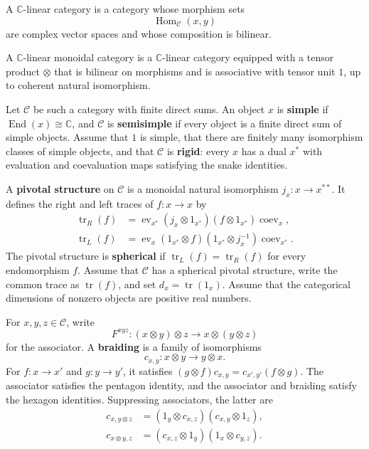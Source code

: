 \documentclass{article}
\newcommand{\trace}{\operatorname{tr}}
\newcommand{\ev}{\operatorname{ev}}
\newcommand{\coev}{\operatorname{coev}}
\newcommand{\End}{\operatorname{End}}
\begin{document}
A $\mathbb C$-linear category is a category whose morphism sets
\[
\operatorname{Hom}_{\mathcal C}(x,y)
\]
are complex vector spaces and whose composition is bilinear.

A $\mathbb C$-linear monoidal category is a $\mathbb C$-linear category equipped with a tensor product $\otimes$ that is bilinear on morphisms and is associative with tensor unit $1$, up to coherent natural isomorphism.

Let $\mathcal C$ be such a category with finite direct sums. An object $x$ is \textbf{simple} if $\End(x)\cong\mathbb C$, and $\mathcal C$ is \textbf{semisimple} if every object is a finite direct sum of simple objects. Assume that $1$ is simple, that there are finitely many isomorphism classes of simple objects, and that $\mathcal C$ is \textbf{rigid}: every $x$ has a dual $x^*$ with evaluation and coevaluation maps satisfying the snake identities.

A \textbf{pivotal structure} on $\mathcal C$ is a monoidal natural
isomorphism $j_x:x\to x^{**}$. It defines the right and left traces of
$f:x\to x$ by
\[
\begin{aligned}
\trace_R(f)
&=\ev_{x^*}(j_x\otimes1_{x^*})(f\otimes1_{x^*})\coev_x,\\
\trace_L(f)
&=\ev_x(1_{x^*}\otimes f)(1_{x^*}\otimes j_x^{-1})\coev_{x^*}.
\end{aligned}
\]
The pivotal structure is \textbf{spherical} if
$\trace_L(f)=\trace_R(f)$ for every endomorphism $f$. Assume that
$\mathcal C$ has a spherical pivotal structure, write the common trace as
$\trace(f)$, and set $d_x=\trace(1_x)$. Assume that the categorical
dimensions of nonzero objects are positive real numbers.

For $x,y,z\in\mathcal C$, write
\[
F^{xyz}:(x\otimes y)\otimes z\longrightarrow x\otimes(y\otimes z)
\]
for the associator. A \textbf{braiding} is a family of isomorphisms
\[
c_{x,y}:x\otimes y\longrightarrow y\otimes x.
\]
For $f:x\to x'$ and $g:y\to y'$, it satisfies $(g\otimes f)c_{x,y}=c_{x',y'}(f\otimes g)$.
The associator satisfies the pentagon identity, and the associator and braiding satisfy the hexagon identities. Suppressing associators, the latter are
\[
\begin{aligned}
c_{x,y\otimes z}&=(1_y\otimes c_{x,z})(c_{x,y}\otimes1_z),\\
c_{x\otimes y,z}&=(c_{x,z}\otimes1_y)(1_x\otimes c_{y,z}).
\end{aligned}
\]
\end{document}
